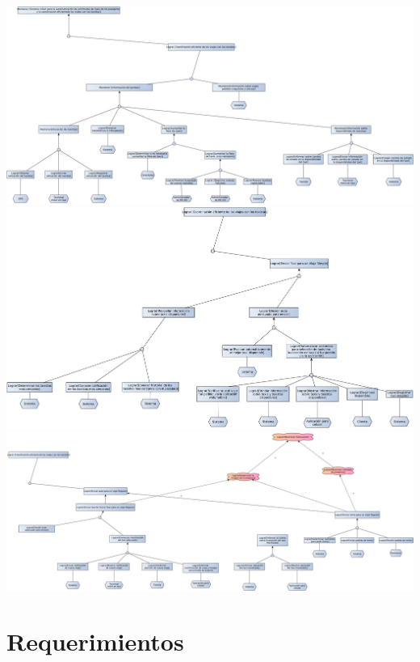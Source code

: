 \documentclass[a4paper]{article}
\begin{document}
\begin{center}
\includegraphics[width=1.3\textwidth,keepaspectratio,angle=90]{diag_objetivos_5.pdf}
\includegraphics[width=1.3\textwidth,keepaspectratio,angle=90]{diag_objetivos_6.pdf}
\includegraphics[width=1.3\textwidth,keepaspectratio,angle=90]{diag_objetivos_7.pdf}




\end{center}


\newpage
\section{Requerimientos}
\end{document}
